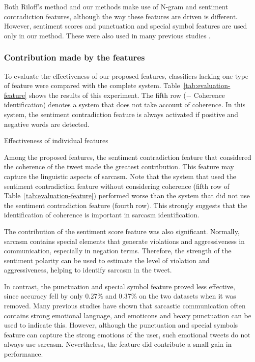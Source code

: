 \documentclass[english]{jnlp_1.4}
\begin{document}
Both Riloff's method and our methods make use of N-gram and sentiment contradiction features, although the way these features are driven is different.
However, sentiment scores and punctuation and special symbol features are used only in our method.
These were also used in many previous studies \cite{Tsur_2010,Davidov_2010,Reyes_2012,Reyes_2013}.


\subsubsection{Contribution made by the features}

To evaluate the effectiveness of our proposed features, classifiers lacking one type of feature were compared with the complete system.
Table~\ref{tab:evaluation-feature} shows the results of this experiment.
The fifth row ($-$ Coherence identification) denotes a system that does not take account of coherence.
In this system, the sentiment contradiction feature is always activated if positive and negative words are detected.

\begin{table}[t]
\caption{Effectiveness of individual features}
\label{tab:evaluation-feature}

\end{table}

Among the proposed features, the sentiment contradiction feature that considered the coherence of the tweet made the greatest contribution.
This feature may capture the linguistic aspects of sarcasm.
Note that the system that used the sentiment contradiction feature without considering coherence (fifth row of Table~\ref{tab:evaluation-feature}) performed worse than the system that did not use the sentiment contradiction feature (fourth row).
This strongly suggests that the identification of coherence is important in sarcasm identification.

The contribution of the sentiment score feature was also significant.
Normally, sarcasm contains special elements that generate violations and aggressiveness in communication, especially in negation terms.
Therefore, the strength of the sentiment polarity can be used to estimate the level of violation and aggressiveness, helping to identify sarcasm in the tweet.

In contrast, the punctuation and special symbol feature proved less effective, since accuracy fell by only 0.27\% and 0.37\% on the two datasets when it was removed.
Many previous studies have shown that sarcastic communication often contains strong emotional language, and emoticons and heavy punctuation can be used to indicate this.
However, although the punctuation and special symbols feature can capture the strong emotions of the user, such emotional tweets do not always use sarcasm.
Nevertheless, the feature did contribute a small gain in performance.
\end{document}
